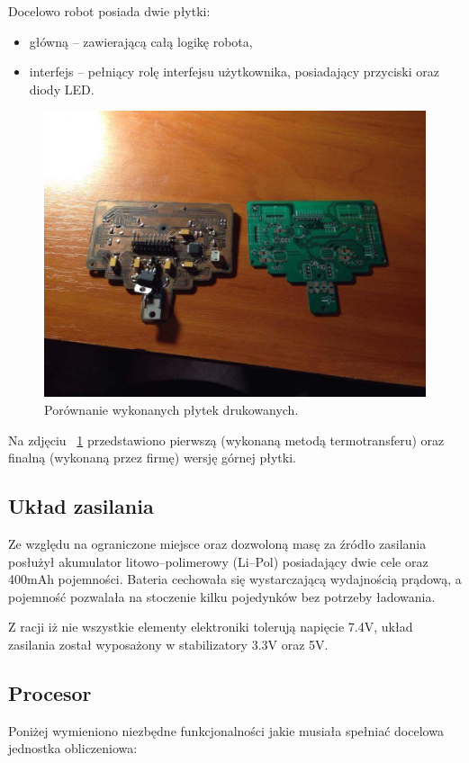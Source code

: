 Docelowo robot posiada dwie płytki:
\begin{itemize}
\item główną – zawierającą całą logikę robota,
\item interfejs – pełniący rolę interfejsu użytkownika, posiadający przyciski oraz diody LED.
\end{itemize}


\begin{figure}[H]
	\centering
		\includegraphics[width=0.75\linewidth]{pic04/boards.JPG}
	\caption{Porównanie wykonanych płytek drukowanych.}
	\label{fig:boards}	
\end{figure}

Na zdjęciu ~\ref{fig:boards} przedstawiono pierwszą  (wykonaną metodą termotransferu) oraz finalną (wykonaną przez firmę) wersję górnej płytki.  

\subsection{Układ zasilania}
Ze względu na ograniczone miejsce oraz dozwoloną masę za źródło zasilania posłużył akumulator litowo–polimerowy (Li–Pol) posiadający dwie cele oraz 400mAh pojemności. Bateria cechowała się wystarczającą wydajnością prądową, a pojemność pozwalała na stoczenie kilku pojedynków bez potrzeby ładowania. 

Z racji iż nie wszystkie elementy elektroniki tolerują napięcie 7.4V, układ zasilania został wyposażony w stabilizatory 3.3V oraz 5V. 

\subsection{Procesor}
Poniżej wymieniono niezbędne funkcjonalności jakie musiała spełniać docelowa jednostka obliczeniowa:

